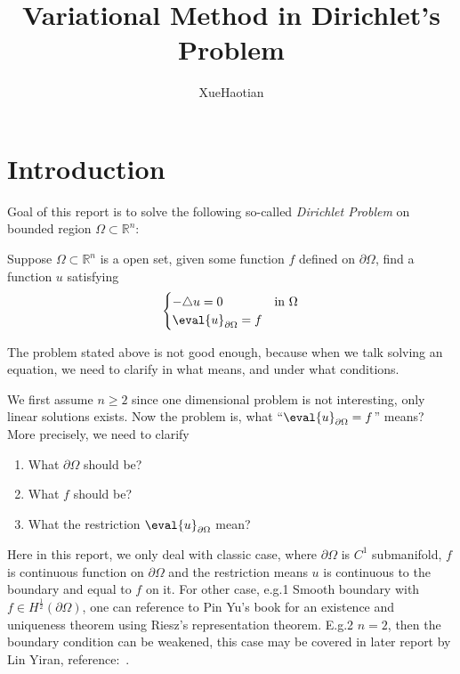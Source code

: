 \documentclass[UTF8,12pt]{article}
\title{Variational Method in Dirichlet's Problem}
\author{XueHaotian}
\date{\displaydate{date-1}}
\numberwithin{theorem}{section}
\numberwithin{equation}{section}
\begin{document}
\maketitle

\section{Introduction}
Goal of this report is to solve the following so-called \emph{Dirichlet Problem} on
bounded region \(\Omega\subset \mathbb{R}^n\):
\begin{problem}\label{porb:boundary-value}
    Suppose \(\Omega\subset \mathbb{R}^n\) is a open set, given some function 
    \(f\) defined on \(\partial\Omega\), find a function \(u\) satisfying \[
        \begin{cases}
            -\triangle u=0 & \text{in }\Omega \\
            \eval{u}_{\partial\Omega}=f &
        \end{cases}
    \]
\end{problem}
\begin{remark}
    The problem stated above is not good enough, because when we talk solving an
    equation, we need to clarify in what means, and under what conditions.
\end{remark}
We first assume \(n\ge 2\) since one dimensional problem is not interesting, only
linear solutions exists. Now the problem is, what ``\(\eval{u}_{\partial\Omega}=f\)''
means? More precisely, we need to clarify
\begin{enumerate}[(1)]
    \item What \(\partial\Omega\) should be?
    \item What \(f\) should be?
    \item What the restriction \(\eval{u}_{\partial\Omega}\) mean?
\end{enumerate}

Here in this report, we only deal with classic case, where \(\partial\Omega\) is
\(C^1\) submanifold, \(f\) is continuous function on \(\partial\Omega\) and the
restriction means \(u\) is continuous to the boundary and equal to \(f\) on it.
For other case, e.g.1 Smooth boundary with \(f\in H^{\frac{1}{2}}(\partial\Omega)\),
one can reference to Pin Yu's book for an existence and uniqueness theorem using 
Riesz's representation theorem. E.g.2 \(n=2\), then the boundary condition can be
weakened, this case may be covered in later report by Lin Yiran,
reference:~\cite{courant_dirichlets_1977}.
\end{document}
